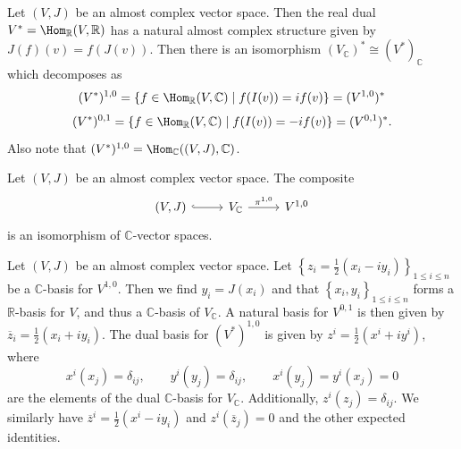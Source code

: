 \begin{lemma}\label{lma:3.1.10}
	Let $(V,J)$ be an almost complex vector space. Then the real dual $V^*=\Hom_\mathbb{R} (V, \mathbb{R} ) $ has a natural almost complex structure given by $J(f)(v)=f(J(v))$. Then there is an isomorphism $(V_\mathbb{C} )^* \cong (V^*)_\mathbb{C} $ which decomposes as
	\[
		(V^*)^{1,0} =\left\{ f\in \Hom_\mathbb{R} (V,\mathbb{C} )\mid f(I(v))=if(v) \right\} =(V^{1,0} )^*
	\]
	\[
		(V^*)^{0,1} =\left\{ f\in \Hom_\mathbb{R} (V,\mathbb{C} )\mid f(I(v))=-if(v) \right\} =(V^{0,1} )^*
	.\]
	Also note that $(V^*)^{1,0} =\Hom_\mathbb{C} ((V,J),\mathbb{C} )$.
\end{lemma}

\begin{remark}\label{rmk:3.1.11}
	Let $(V,J)$ be an almost complex vector space. The composite
	\[\begin{tikzcd}[row sep = 2.5em, column sep = 2.5em]
		(V,J) \ar[hook, r]  & V_\mathbb{C} \ar[" \pi ^{1,0}  ", r]  & V^{1,0} 
	\end{tikzcd}\]
	is an isomorphism of $\mathbb{C} $-vector spaces.
\end{remark}


\begin{discussion}\label{discussion:3.1.12}
	Let $(V,J)$ be an almost complex vector space. Let $\left\{ z_i = \frac{1}{2} (x_i - iy_i) \right\}_{1\leq i\leq n} $ be a $\mathbb{C} $-basis for $V^{1,0} $. Then we find $y_i = J(x_i)$ and that $\left\{ x_i, y_i \right\}_{1\leq i\leq n} $ forms a $\mathbb{R} $-basis for $V$, and thus a $\mathbb{C} $-basis of $V_\mathbb{C} $. A natural basis for $V^{0,1} $ is then given by $\overline{z} _i = \frac{1}{2} \left( x_i + iy_i \right) $. The dual basis for $(V^*)^{1,0} $ is given by $z^i = \frac{1}{2} \left( x^i + iy^i \right) $, where
	\[
		x^i(x_j) = \delta _{ij} ,\qquad y^i(y_j) = \delta _{ij} ,\qquad x^i(y_j)=y^i(x_j)=0
	\]
	are the elements of the dual $\mathbb{C} $-basis for $V_\mathbb{C} $. Additionally, $z^i(z_j)=\delta _{ij} $. We similarly have $\overline{z} ^i = \frac{1}{2} \left( x^i - iy_i \right) $ and $z^i(\overline{z} _j) = 0$ and the other expected identities.
\end{discussion}

